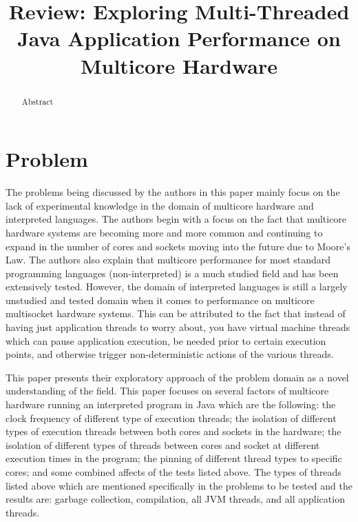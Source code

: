 \documentclass[conference]{IEEEtran}
\begin{document}
\title{Review: Exploring Multi-Threaded Java Application Performance on Multicore Hardware}

\author{
}

\maketitle


\begin{abstract}
Abstract
\end{abstract}


\section{Problem}

The problems being discussed by the authors in this paper mainly focus on the lack of 
experimental knowledge in the domain of multicore hardware and interpreted languages.
The authors begin with a focus on the fact that multicore hardware systems are becoming
more and more common and continuing to expand in the number of cores and sockets moving
into the future due to Moore's Law. The authors also explain that multicore performance
for most standard programming languages (non-interpreted) is a much studied field and
has been extensively tested. However, the domain of interpreted languages is still a largely
unstudied and tested domain when it comes to performance on multicore multisocket hardware
systems. This can be attributed to the fact that instead of having just application threads to
worry about, you have virtual machine threads which can pause application execution, be needed
prior to certain execution points, and otherwise trigger non-deterministic actions of the various threads.

This paper presents their exploratory approach of the problem domain as a novel understanding of 
the field. This paper focuses on several factors of multicore hardware running an interpreted
program in Java which are the following: the clock frequency of different type of execution threads; 
the isolation of different types of execution threads between both cores and sockets in the 
hardware; the isolation of different types of threads between cores and socket at different
execution times in the program; the pinning of different thread types to specific cores; and some
combined affects of the tests listed above. The types of threads listed above which are mentioned
specifically in the problems to be tested and the results are: garbage collection, compilation, 
all JVM threads, and all application threads.
\end{document}
